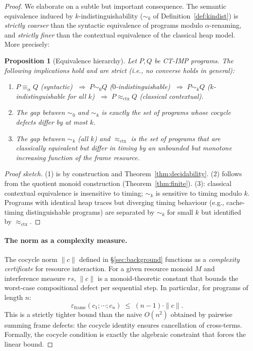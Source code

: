 \documentclass[acmsmall,sigplan,anonymous,review,screen]{acmart}
\theoremstyle{plain}
\newtheorem{proposition}[theorem]{Proposition}
\theoremstyle{definition}
\newcommand{\rs}{\mathit{rs}}
\newcommand{\norm}[1]{\|#1\|}
\newcommand{\defect}{\varepsilon}
\begin{document}
\begin{proof}
We elaborate on a subtle but important consequence.  The semantic
equivalence induced by $k$-indistinguishability ($\sim_k$ of
Definition~\ref{def:kindist}) is \emph{strictly coarser} than the
syntactic equivalence of programs modulo $\alpha$-renaming, and
\emph{strictly finer} than the contextual equivalence of the classical
heap model.  More precisely:

\begin{proposition}[Equivalence hierarchy]
\label{prop:equiv-hierarchy}
  Let $P, Q$ be CT-IMP programs.  The following implications hold and are
  strict (i.e., no converse holds in general):
  \begin{enumerate}
    \item $P \equiv_\alpha Q$ (syntactic)
      $\;\Rightarrow\; P \sim_0 Q$ ($0$-indistinguishable)
      $\;\Rightarrow\; P \sim_k Q$ ($k$-indistinguishable for all $k$)
      $\;\Rightarrow\; P \approx_{\mathrm{ctx}} Q$ (classical contextual).
    \item The gap between $\sim_0$ and $\sim_k$ is exactly the set of programs
      whose cocycle defects differ by at most $k$.
    \item The gap between $\sim_k$ (all $k$) and $\approx_{\mathrm{ctx}}$ is the
      set of programs that are classically equivalent but differ in timing by
      an unbounded but monotone increasing function of the frame resource.
  \end{enumerate}
\end{proposition}

\begin{proof}[Proof sketch]
  (1) is by construction and Theorem~\ref{thm:decidability}.
  (2) follows from the quotient monoid construction (Theorem~\ref{thm:finite}).
  (3): classical contextual equivalence is insensitive to timing;
  $\sim_k$ is sensitive to timing modulo $k$.  Programs with identical
  heap traces but diverging timing behaviour (e.g., cache-timing distinguishable
  programs) are separated by $\sim_k$ for small $k$ but identified by
  $\approx_{\mathrm{ctx}}$.
\end{proof}

\paragraph{The norm as a complexity measure.}
The cocycle norm $\norm{c}$ defined in \S\ref{sec:background} functions as
a \emph{complexity certificate} for resource interaction.  For a given
resource monoid $M$ and interference measure $\rs$, $\norm{c}$ is a
monoid-theoretic constant that bounds the worst-case compositional defect
per sequential step.  In particular, for programs of length $n$:
\[
  \defect_{\mathrm{frame}}(c_1; \cdots ; c_n) \;\leq\; (n-1) \cdot \norm{c}.
\]
This is a strictly tighter bound than the naive $O(n^2)$ obtained by
pairwise summing frame defects: the cocycle identity ensures cancellation
of cross-terms.  Formally, the cocycle condition is exactly the algebraic
constraint that forces the linear bound.


\end{proof}
\end{document}
